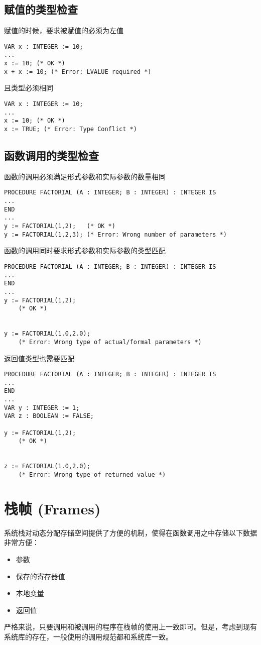 ﻿\documentclass{article}
\begin{document}
\subsection{赋值的类型检查}

赋值的时候，要求被赋值的必须为左值
\begin{lstlisting}
VAR x : INTEGER := 10;
...
x := 10; (* OK *)
x + x := 10; (* Error: LVALUE required *)
\end{lstlisting}

且类型必须相同
\begin{lstlisting}
VAR x : INTEGER := 10;
...
x := 10; (* OK *)
x := TRUE; (* Error: Type Conflict *)
\end{lstlisting}

\subsection{函数调用的类型检查}
函数的调用必须满足形式参数和实际参数的数量相同
\begin{lstlisting}
PROCEDURE FACTORIAL (A : INTEGER; B : INTEGER) : INTEGER IS 
...
END
...
y := FACTORIAL(1,2);   (* OK *)
y := FACTORIAL(1,2,3); (* Error: Wrong number of parameters *)
\end{lstlisting}

函数的调用同时要求形式参数和实际参数的类型匹配
\begin{lstlisting}
PROCEDURE FACTORIAL (A : INTEGER; B : INTEGER) : INTEGER IS 
...
END
...
y := FACTORIAL(1,2);     
    (* OK *)
    
    
y := FACTORIAL(1.0,2.0); 
    (* Error: Wrong type of actual/formal parameters *)
\end{lstlisting}

返回值类型也需要匹配
\begin{lstlisting}
PROCEDURE FACTORIAL (A : INTEGER; B : INTEGER) : INTEGER IS 
...
END
...
VAR y : INTEGER := 1;
VAR z : BOOLEAN := FALSE;

y := FACTORIAL(1,2);     
    (* OK *)
    
    
z := FACTORIAL(1.0,2.0); 
    (* Error: Wrong type of returned value *)
\end{lstlisting}


\section{栈帧 (Frames)}
系统栈对动态分配存储空间提供了方便的机制，使得在函数调用之中存储以下数据非常方便：
\begin{itemize}
\item 参数
\item 保存的寄存器值
\item 本地变量
\item 返回值
\end{itemize}
严格来说，只要调用和被调用的程序在栈帧的使用上一致即可。但是，考虑到现有系统库的存在，一般使用的调用规范都和系统库一致。
\end{document}

